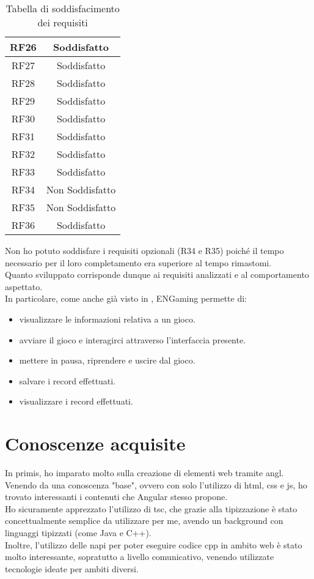 \begin{longtable}{|c|c|}
    \hline
    RF26&Soddisfatto\\
    \hline
    RF27&Soddisfatto\\
    \hline
    RF28&Soddisfatto\\
    \hline
    RF29&Soddisfatto\\
    \hline
    RF30&Soddisfatto\\
    \hline
    RF31&Soddisfatto\\
    \hline
    RF32&Soddisfatto\\
    \hline
    RF33&Soddisfatto\\
    \hline
    RF34&Non Soddisfatto\\
    \hline
    RF35&Non Soddisfatto\\
    \hline
    RF36&Soddisfatto
    \hline
    \caption{Tabella di soddisfacimento dei requisiti}
\end{longtable}
Non ho potuto soddisfare i requisiti opzionali (R34 e R35) poiché il tempo necessario per il loro completamento era superiore al tempo rimastomi.\\
Quanto sviluppato corrisponde dunque ai requisiti analizzati e al comportamento aspettato.\\
In particolare, come anche già visto in , ENGaming permette di:
\begin{itemize}
    \item visualizzare le informazioni relativa a un gioco.
    \item avviare il gioco e interagirci attraverso l'interfaccia presente.
    \item mettere in pausa, riprendere e uscire dal gioco.
    \item salvare i record effettuati.
    \item visualizzare i record effettuati.
\end{itemize}
\section{Conoscenze acquisite}
In primis, ho imparato molto sulla creazione di elementi web tramite \gls{angl}. Venendo da una conoscenza "base", ovvero con solo l'utilizzo di \gls{html}, \gls{css} e \gls{js}, ho trovato interessanti i contenuti che Angular stesso propone.\\
Ho sicuramente apprezzato l'utilizzo di \gls{tsc}, che grazie alla tipizzazione è stato concettualmente semplice da utilizzare per me, avendo un background con linguaggi tipizzati (come Java e C++).\\
Inoltre, l'utilizzo delle \gls{napi} per poter eseguire codice \gls{cpp} in ambito web è stato molto interessante, sopratutto a livello comunicativo, venendo utilizzate tecnologie ideate per ambiti diversi.
